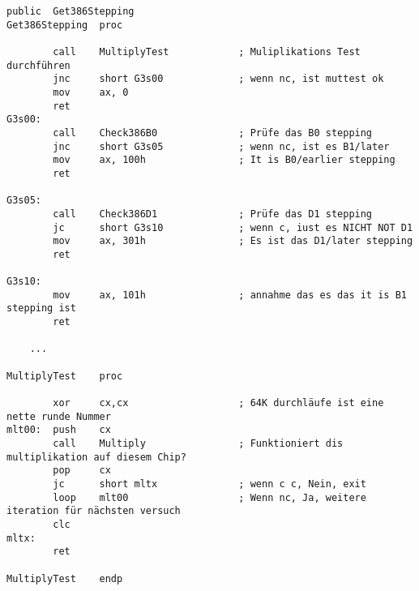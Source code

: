 \begin{lstlisting}[style=customasmx86]
        public  Get386Stepping
Get386Stepping  proc

        call    MultiplyTest            ; Muliplikations Test durchführen
        jnc     short G3s00             ; wenn nc, ist muttest ok
        mov     ax, 0
        ret
G3s00:
        call    Check386B0              ; Prüfe das B0 stepping
        jnc     short G3s05             ; wenn nc, ist es B1/later
        mov     ax, 100h                ; It is B0/earlier stepping
        ret

G3s05:
        call    Check386D1              ; Prüfe das D1 stepping
        jc      short G3s10             ; wenn c, iust es NICHT NOT D1
        mov     ax, 301h                ; Es ist das D1/later stepping
        ret

G3s10:
        mov     ax, 101h                ; annahme das es das it is B1 stepping ist
        ret

	...

MultiplyTest    proc

        xor     cx,cx                   ; 64K durchläufe ist eine nette runde Nummer
mlt00:  push    cx
        call    Multiply                ; Funktioniert dis multiplikation auf diesem Chip?
        pop     cx
        jc      short mltx              ; wenn c c, Nein, exit
        loop    mlt00                   ; Wenn nc, Ja, weitere iteration für nächsten versuch
        clc
mltx:
        ret

MultiplyTest    endp
\end{lstlisting}


